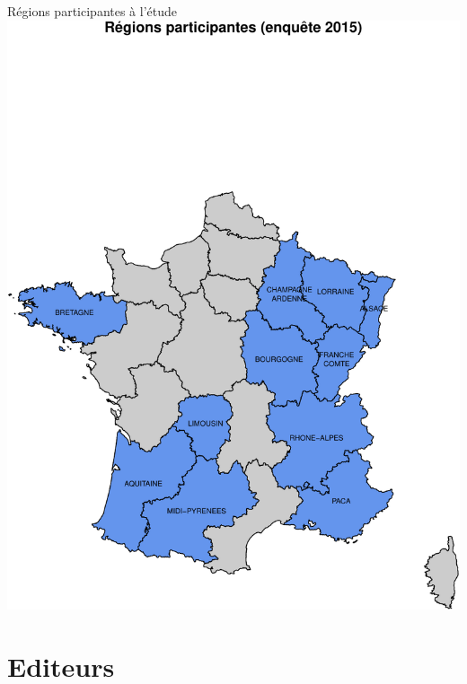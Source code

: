 \documentclass[]{article}
\begin{document}
Régions participantes à l'étude
\includegraphics{septembre2015_files/figure-latex/unnamed-chunk-4-1.pdf}

\section{Editeurs}\label{editeurs}
\end{document}
